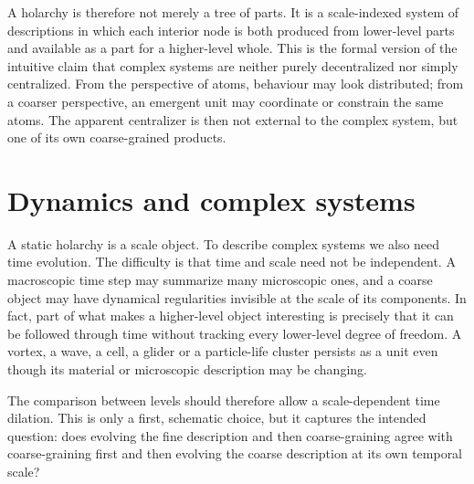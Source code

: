 \documentclass[runningheads]{llncs}
\begin{document}
A holarchy is therefore not merely a tree of parts. It is a scale-indexed system of descriptions in which each interior node is both produced from lower-level parts and available as a part for a higher-level whole. This is the formal version of the intuitive claim that complex systems are neither purely decentralized nor simply centralized. From the perspective of atoms, behaviour may look distributed; from a coarser perspective, an emergent unit may coordinate or constrain the same atoms. The apparent centralizer is then not external to the complex system, but one of its own coarse-grained products.

\section{Dynamics and complex systems}

A static holarchy is a scale object. To describe complex systems we also need time evolution. The difficulty is that time and scale need not be independent. A macroscopic time step may summarize many microscopic ones, and a coarse object may have dynamical regularities invisible at the scale of its components. In fact, part of what makes a higher-level object interesting is precisely that it can be followed through time without tracking every lower-level degree of freedom. A vortex, a wave, a cell, a glider or a particle-life cluster persists as a unit even though its material or microscopic description may be changing.

The comparison between levels should therefore allow a scale-dependent time dilation. This is only a first, schematic choice, but it captures the intended question: does evolving the fine description and then coarse-graining agree with coarse-graining first and then evolving the coarse description at its own temporal scale?
\end{document}
